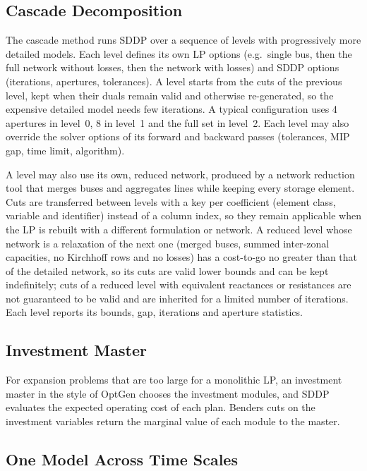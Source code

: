 \subsection{Cascade Decomposition}
\label{sec:cascade}

The cascade method runs SDDP over a sequence of levels with
progressively more detailed models.  Each level defines its own LP
options (e.g.\ single bus, then the full network without losses, then
the network with losses) and SDDP options (iterations, apertures,
tolerances).  A level starts from the cuts of the previous level, kept
when their duals remain valid and otherwise re-generated, so the
expensive detailed model needs few iterations.  A typical configuration
uses 4 apertures in level~0, 8 in level~1 and the full set in level~2.
Each level may also override the solver options of its forward and
backward passes (tolerances, MIP gap, time limit, algorithm).

A level may also use its own, reduced network, produced by a network
reduction tool that merges buses and aggregates lines while keeping
every storage element.  Cuts are transferred between levels with a key
per coefficient (element class, variable and identifier) instead of a
column index, so they remain applicable when the LP is rebuilt with a
different formulation or network.  A reduced level whose network is a
relaxation of the next one (merged buses, summed inter-zonal capacities,
no Kirchhoff rows and no losses) has a cost-to-go no greater than that
of the detailed network, so its cuts are valid lower bounds and can be
kept indefinitely; cuts of a reduced level with equivalent reactances
or resistances are not guaranteed to be valid and are inherited for a
limited number of iterations.  Each level reports its bounds, gap,
iterations and aperture statistics.

\subsection{Investment Master}
\label{sec:investment_master}

For expansion problems that are too large for a monolithic LP, an
investment master in the style of OptGen chooses the investment
modules, and SDDP evaluates the expected operating cost of each plan.
Benders cuts on the investment variables return the marginal value of
each module to the master.

\subsection{One Model Across Time Scales}
\label{sec:multiscale}

